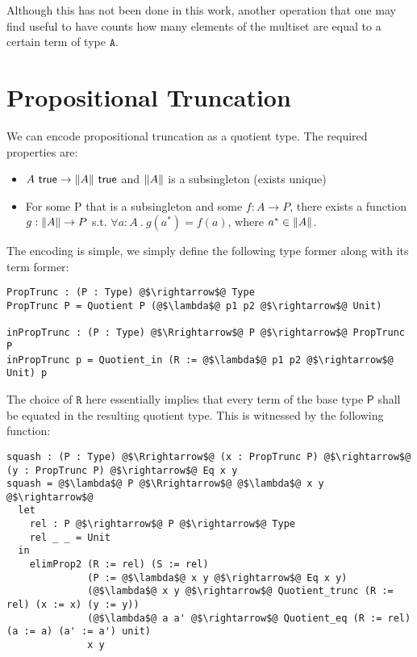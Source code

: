\documentclass[12pt,twoside,maitrise]{dms}
\theoremstyle{definition}
\numberwithin{equation}{section}
\numberwithin{table}{chapter}
\numberwithin{figure}{chapter}
\DeclarePairedDelimiter{\norm}{\lVert}{\rVert}
\newcommand\kw[1] {\textsf{#1}}
\newcommand\id[1] {\texttt{#1}}
\newcommand\fn[1] {\texttt{#1}}
\begin{document}
Although this has not been done in this work, another operation that one may find
useful to have counts how many elements of the multiset are equal to
a certain term of type $\fn{A}$.

\section{Propositional Truncation}

We can encode propositional truncation as a quotient type. The required properties are:

\begin{itemize}
	\item $A \ \kw{true} \rightarrow \norm{A} \ \kw{true}$ and $\norm{A}$
      is a subsingleton (exists unique)
	\item For some P that is a subsingleton and some $f : A \rightarrow P$, there exists a function $g : \norm{A} \rightarrow P$ s.t. $ \forall a : A \ . \ g(a^*) = f(a)$, where $a^* \in \norm{A}$.
\end{itemize}

The encoding is simple, we simply define the following type former along with its term former:

\begin{verbatim}
PropTrunc : (P : Type) @$\rightarrow$@ Type
PropTrunc P = Quotient P (@$\lambda$@ p1 p2 @$\rightarrow$@ Unit)

inPropTrunc : (P : Type) @$\Rrightarrow$@ P @$\rightarrow$@ PropTrunc P
inPropTrunc p = Quotient_in (R := @$\lambda$@ p1 p2 @$\rightarrow$@ Unit) p
\end{verbatim}

The choice of $\id{R}$ here essentially implies that every term of the base type $\kw{P}$ shall be equated in the resulting quotient type. This is witnessed by the following function:

\begin{verbatim}
squash : (P : Type) @$\Rrightarrow$@ (x : PropTrunc P) @$\rightarrow$@ (y : PropTrunc P) @$\rightarrow$@ Eq x y
squash = @$\lambda$@ P @$\Rrightarrow$@ @$\lambda$@ x y @$\rightarrow$@
  let
    rel : P @$\rightarrow$@ P @$\rightarrow$@ Type
    rel _ _ = Unit
  in
    elimProp2 (R := rel) (S := rel)
              (P := @$\lambda$@ x y @$\rightarrow$@ Eq x y)
              (@$\lambda$@ x y @$\rightarrow$@ Quotient_trunc (R := rel) (x := x) (y := y))
              (@$\lambda$@ a a' @$\rightarrow$@ Quotient_eq (R := rel) (a := a) (a' := a') unit)
              x y
\end{verbatim}
\end{document}
